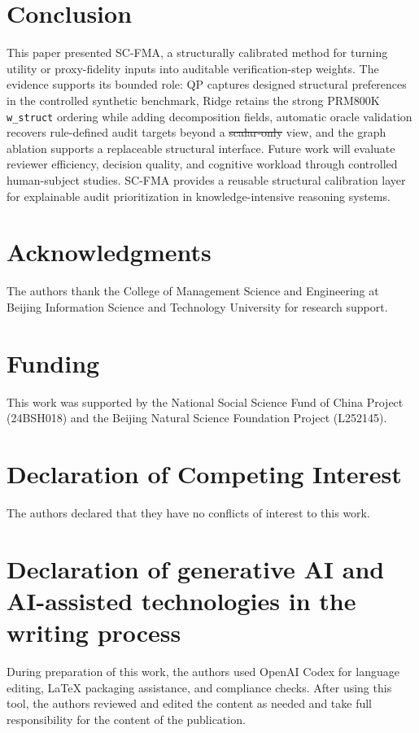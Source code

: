 \documentclass[a4paper,fleqn]{cas-sc}
\makeatletter
\newcommand{\scalarOnly}{\mbox{scalar-only}} %
\providecommand{\DIFaddtex}[1]{{\protect\color{blue}\uwave{#1}}} %
\providecommand{\DIFdeltex}[1]{{\protect\color{red}\sout{#1}}} %
\providecommand{\DIFaddbegin}{} %
\providecommand{\DIFaddend}{} %
\providecommand{\DIFdelbegin}{} %
\providecommand{\DIFdelend}{} %
\providecommand{\DIFadd}[1]{\texorpdfstring{\DIFaddtex{#1}}{#1}} %
\providecommand{\DIFdel}[1]{\texorpdfstring{\DIFdeltex{#1}}{}} %
\providecommand{\DIFscaledelfig}{0.5}
\newlength{\DIFdelgraphicswidth} %
\newlength{\DIFdelgraphicsheight} %
\providecommand{\DIFaddincludegraphics}[2][]{{\color{blue}\fbox{\DIFOincludegraphics[#1]{#2}}}} %
\providecommand{\DIFdelincludegraphics}[2][]{%
\sbox{\DIFdelgraphicsbox}{\DIFOincludegraphics[#1]{#2}}%
\settoboxwidth{\DIFdelgraphicswidth}{\DIFdelgraphicsbox} %
\settoboxtotalheight{\DIFdelgraphicsheight}{\DIFdelgraphicsbox} %
\scalebox{\DIFscaledelfig}{%
\parbox[b]{\DIFdelgraphicswidth}{\usebox{\DIFdelgraphicsbox}\\[-\baselineskip] \rule{\DIFdelgraphicswidth}{0em}}\llap{\resizebox{\DIFdelgraphicswidth}{\DIFdelgraphicsheight}{%
\setlength{\unitlength}{\DIFdelgraphicswidth}%
\begin{picture}(1,1)%
\thicklines\linethickness{2pt} %
{\color[rgb]{1,0,0}\put(0,0){\framebox(1,1){}}}%
{\color[rgb]{1,0,0}\put(0,0){\line( 1,1){1}}}%
{\color[rgb]{1,0,0}\put(0,1){\line(1,-1){1}}}%
\end{picture}%
}\hspace*{3pt}}} %
} %
\DeclareRobustCommand{\DIFaddbegin}{\DIFOaddbegin \let\includegraphics\DIFaddincludegraphics} %
\DeclareRobustCommand{\DIFaddend}{\DIFOaddend \let\includegraphics\DIFOincludegraphics} %
\DeclareRobustCommand{\DIFdelbegin}{\DIFOdelbegin \let\includegraphics\DIFdelincludegraphics} %
\DeclareRobustCommand{\DIFdelend}{\DIFOaddend \let\includegraphics\DIFOincludegraphics} %
\let\sout@orig\sout %
\renewcommand{\sout}[1]{\ifmmode\text{\sout@orig{\ensuremath{#1}}}\else\sout@orig{#1}\fi} %
\makeatother
\begin{document}
\section{Conclusion}

This paper presented SC-FMA, a structurally calibrated method for turning utility or proxy-fidelity inputs into auditable verification-step weights. The evidence supports its bounded role: QP captures designed structural preferences in the controlled synthetic benchmark, Ridge retains the strong PRM800K \texttt{w\_struct} ordering while adding decomposition fields, automatic oracle validation recovers rule-defined audit targets beyond a \DIFdelbegin \DIFdel{scalar-only }\DIFdelend \DIFaddbegin \DIFadd{\scalarOnly{} }\DIFaddend view, and the graph ablation supports a replaceable structural interface. Future work will evaluate reviewer efficiency, decision quality, and cognitive workload through controlled human-subject studies. SC-FMA provides a reusable structural calibration layer for explainable audit prioritization in knowledge-intensive reasoning systems.

\section*{Acknowledgments}
The authors thank the College of Management Science and Engineering at Beijing Information Science and Technology University for research support.

\section*{Funding}
This work was supported by the National Social Science Fund of China Project (24BSH018) and the Beijing Natural Science Foundation Project (L252145).

\section*{Declaration of Competing Interest}
The authors declared that they have no conflicts of interest to this work.

\section*{Declaration of generative AI and AI-assisted technologies in the writing process}
During preparation of this work, the authors used OpenAI Codex for language editing, LaTeX packaging assistance, and compliance checks. After using this tool, the authors reviewed and edited the content as needed and take full responsibility for the content of the publication.
\end{document}
